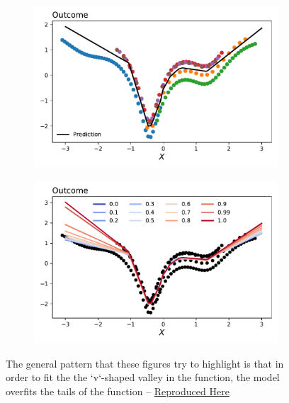 \documentclass[a4paper,12pt]{article}
\begin{document}
\begin{figure}[htbp]
\centering
\begin{subfigure}{.48\textwidth}
    \centering
    \includegraphics[width=.95\linewidth]{figures/framework/gradient_descent_motivating_example.pdf}
\end{subfigure}
\begin{subfigure}{.48\textwidth}
    \centering
    \includegraphics[width=.95\linewidth]{figures/framework/gradient_descent_motivating_example_tune.pdf}
\end{subfigure}
\caption{The general pattern that these figures try to highlight is that in order to fit the the `v`-shaped valley in the function, the model overfits the tails of the function -- \href{https://github.com/pharringtonp19/jmp_paper/blob/main/notebooks/gradient_descent_motivating_example.ipynb}{Reproduced Here}}
\end{figure}
\end{document}
